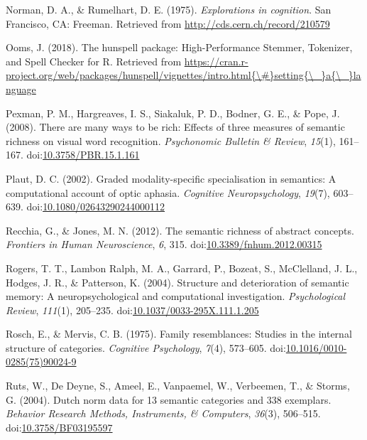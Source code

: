 \documentclass[man]{apa6}
\begin{document}
\leavevmode\hypertarget{ref-Norman1975}{}%
Norman, D. A., \& Rumelhart, D. E. (1975). \emph{Explorations in cognition}. San Francisco, CA: Freeman. Retrieved from \url{http://cds.cern.ch/record/210579}

\leavevmode\hypertarget{ref-Ooms2018}{}%
Ooms, J. (2018). The hunspell package: High-Performance Stemmer, Tokenizer, and Spell Checker for R. Retrieved from \href{https://cran.r-project.org/web/packages/hunspell/vignettes/intro.html\%7B/\#\%7Dsetting\%7B/_\%7Da\%7B/_\%7Dlanguage}{https://cran.r-project.org/web/packages/hunspell/vignettes/intro.html\{\textbackslash{}\#\}setting\{\textbackslash{}\_\}a\{\textbackslash{}\_\}language}

\leavevmode\hypertarget{ref-Pexman2008}{}%
Pexman, P. M., Hargreaves, I. S., Siakaluk, P. D., Bodner, G. E., \& Pope, J. (2008). There are many ways to be rich: Effects of three measures of semantic richness on visual word recognition. \emph{Psychonomic Bulletin \& Review}, \emph{15}(1), 161--167. doi:\href{https://doi.org/10.3758/PBR.15.1.161}{10.3758/PBR.15.1.161}

\leavevmode\hypertarget{ref-Plaut2002}{}%
Plaut, D. C. (2002). Graded modality-specific specialisation in semantics: A computational account of optic aphasia. \emph{Cognitive Neuropsychology}, \emph{19}(7), 603--639. doi:\href{https://doi.org/10.1080/02643290244000112}{10.1080/02643290244000112}

\leavevmode\hypertarget{ref-Recchia2012}{}%
Recchia, G., \& Jones, M. N. (2012). The semantic richness of abstract concepts. \emph{Frontiers in Human Neuroscience}, \emph{6}, 315. doi:\href{https://doi.org/10.3389/fnhum.2012.00315}{10.3389/fnhum.2012.00315}

\leavevmode\hypertarget{ref-Rogers2004}{}%
Rogers, T. T., Lambon Ralph, M. A., Garrard, P., Bozeat, S., McClelland, J. L., Hodges, J. R., \& Patterson, K. (2004). Structure and deterioration of semantic memory: A neuropsychological and computational investigation. \emph{Psychological Review}, \emph{111}(1), 205--235. doi:\href{https://doi.org/10.1037/0033-295X.111.1.205}{10.1037/0033-295X.111.1.205}

\leavevmode\hypertarget{ref-Rosch1975}{}%
Rosch, E., \& Mervis, C. B. (1975). Family resemblances: Studies in the internal structure of categories. \emph{Cognitive Psychology}, \emph{7}(4), 573--605. doi:\href{https://doi.org/10.1016/0010-0285(75)90024-9}{10.1016/0010-0285(75)90024-9}

\leavevmode\hypertarget{ref-Ruts2004}{}%
Ruts, W., De Deyne, S., Ameel, E., Vanpaemel, W., Verbeemen, T., \& Storms, G. (2004). Dutch norm data for 13 semantic categories and 338 exemplars. \emph{Behavior Research Methods, Instruments, \& Computers}, \emph{36}(3), 506--515. doi:\href{https://doi.org/10.3758/BF03195597}{10.3758/BF03195597}
\end{document}
